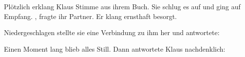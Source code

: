 \par

Plötzlich erklang Klaus Stimme aus ihrem Buch. Sie schlug es auf und ging auf Empfang. , fragte ihr Partner. Er klang ernsthaft besorgt.

\par

Niedergeschlagen stellte sie eine Verbindung zu ihm her und antwortete: 

\par

Einen Moment lang blieb alles Still. Dann antwortete Klaus nachdenklich:  
